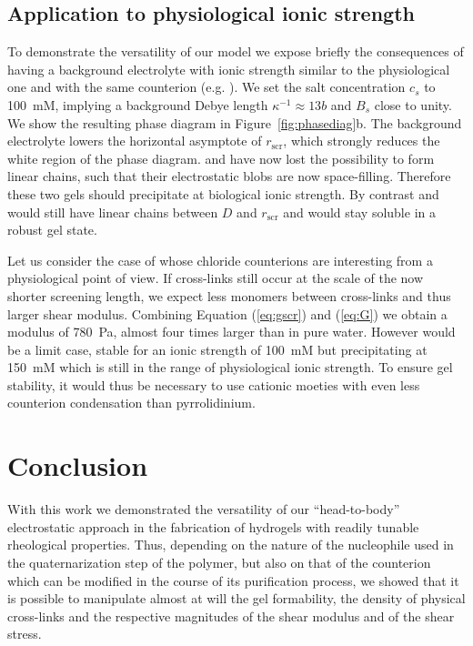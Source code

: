 \documentclass[twoside,twocolumn,9pt]{article}
\begin{document}
{\color{blue}
\subsection{Application to physiological ionic strength}

To demonstrate the versatility of our model we expose briefly the consequences of having a background electrolyte with ionic strength similar to the physiological one and with the same counterion (e.g. ). We set the salt concentration $c_s$ to \SI{100}{\milli M}, implying a background Debye length $\kappa^{-1}\approx 13 b$ and $B_s$ close to unity. We show the resulting phase diagram in Figure~\ref{fig:phasediag}b. The background electrolyte lowers the horizontal asymptote of $r_\mathrm{scr}$, which strongly reduces the white region of the phase diagram.  and  have now lost the possibility to form linear chains, such that their electrostatic blobs are now space-filling. Therefore these two gels should precipitate at biological ionic strength. By contrast  and  would still have linear chains between $D$ and $r_\mathrm{scr}$ and would stay soluble in a robust gel state.

Let us consider the case of  whose chloride counterions are interesting from a physiological point of view. If cross-links still occur at the scale of the now shorter screening length, we expect less monomers between cross-links and thus larger shear modulus. Combining Equation (\ref{eq:gscr}) and (\ref{eq:G}) we obtain a modulus of \SI{780}{\pascal}, almost four times larger than  in pure water. However  would be a limit case, stable for an ionic strength of \SI{100}{\milli M} but precipitating at \SI{150}{\milli M} which is still in the range of physiological ionic strength. To ensure gel stability, it would thus be necessary to use cationic moeties with even less counterion condensation than pyrrolidinium.
}

\section{Conclusion}
With this work we demonstrated the versatility of our ``head-to-body'' electrostatic approach in the fabrication of hydrogels with readily tunable rheological properties. Thus, depending on the nature of the nucleophile used in the quaternarization step of the polymer, but also on that of the counterion which can be modified in the course of its purification process, we showed that it is possible to manipulate almost at will the gel formability, the density of physical cross-links and the respective magnitudes of the shear modulus and of the shear stress. 
\end{document}
